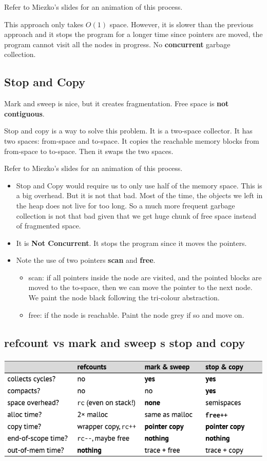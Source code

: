 \documentclass[letterpaper,12pt]{article}
\begin{document}
\begin{itemize}
          Refer to Miezko's slides for an animation of this process.

          This approach only takes $O(1)$ space. However, it is slower than the previous
          approach and it stops the program for a longer time since pointers are moved,
          the program cannot visit all the nodes in progress. No \textbf{concurrent}
          garbage collection.
\end{itemize}
\subsection{Stop and Copy}
Mark and sweep is nice, but it creates fragmentation. Free space is \textbf{not
    contiguous}.

Stop and copy is a way to solve this problem. It is a two-space collector. It
has two spaces: from-space and to-space. It copies the reachable memory blocks
from from-space to to-space. Then it swaps the two spaces.

Refer to Miezko's slides for an animation of this process.

\begin{itemize}
    \item Stop and Copy would require us to only use half of the memory space. This is a
          big overhead. But it is not that bad. Most of the time, the objects we left in
          the heap does not live for too long. So a much more frequent garbage collection
          is not that bad given that we get huge chunk of free space instead of
          fragmented space.
    \item It is \textbf{Not Concurrent}. It stops the program since it moves the
          pointers.
    \item Note the use of two pointers \textbf{scan} and \textbf{free}. \begin{itemize}
              \item scan: if all pointers inside the node are visited, and the pointed blocks are
                    moved to the to-space, then we can move the pointer to the next node. We paint
                    the node black following the tri-colour abstraction.
              \item free: if the node is reachable. Paint the node grey if so and move on.
          \end{itemize}
\end{itemize}
\subsection{refcount vs mark and sweep s stop and copy}
\includegraphics*[scale=0.7]{Images/refcount vs mark and sweep s stop and copy.png}
\end{document}
